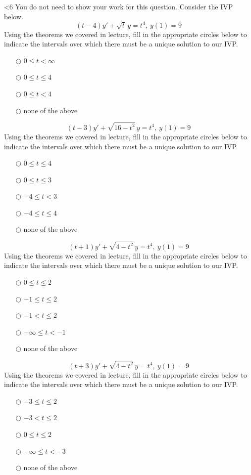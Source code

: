 \ifnum \Version<6
\question[1] You do not need to show your work for this question. Consider the IVP below.
\ifnum {}    
$$\displaystyle (t-4)y' + \sqrt{t}\,y = t^4, \ y(1) = 9$$   
Using the theorems we covered in lecture, fill in the appropriate circles below to indicate the intervals over which there must be a unique solution to our IVP.
\begin{itemize}
    \item[$\bigcirc$] $0 \le t < \infty$
    \item[$\bigcirc$] $0 \le t \le 4$
    \item[$\bigcirc$] $0 \le t < 4$
    \item[$\bigcirc$] none of the above
\end{itemize}
\fi 
\ifnum {}  
$$\displaystyle (t-3)y' + \sqrt{16-t^2}\,y = t^4, \ y(1) = 9$$   
Using the theorems we covered in lecture, fill in the appropriate circles below to indicate the intervals over which there must be a unique solution to our IVP.
\begin{itemize}
    \item[$\bigcirc$] $0 \le t \le 4$
    \item[$\bigcirc$] $0 \le t \le 3$
    \item[$\bigcirc$] $-4 \le t < 3$
    \item[$\bigcirc$] $-4 \le t \le 4$
    \item[$\bigcirc$] none of the above
\end{itemize}
\fi 
\ifnum {} 
$$\displaystyle (t+1)y' + \sqrt{4-t^2}\,y = t^4, \ y(1) = 9$$   
Using the theorems we covered in lecture, fill in the appropriate circles below to indicate the intervals over which there must be a unique solution to our IVP.
\begin{itemize}
    \item[$\bigcirc$] $0 \le t \le 2$
    \item[$\bigcirc$] $-1 \le t \le 2$
    \item[$\bigcirc$] $-1 < t \le 2$
    \item[$\bigcirc$] $-\infty \le t < -1$
    \item[$\bigcirc$] none of the above
\end{itemize}
\fi 
\ifnum {}
$$\displaystyle (t+3)y' + \sqrt{4-t^2}\,y = t^4, \ y(1) = 9$$   
Using the theorems we covered in lecture, fill in the appropriate circles below to indicate the intervals over which there must be a unique solution to our IVP.
\begin{itemize}
    \item[$\bigcirc$] $-3 \le t \le 2$
    \item[$\bigcirc$] $-3 < t \le 2$
    \item[$\bigcirc$] $0 \le t \le 2$    
    \item[$\bigcirc$] $-\infty \le t < -3$
    \item[$\bigcirc$] none of the above
\end{itemize}\fi 
